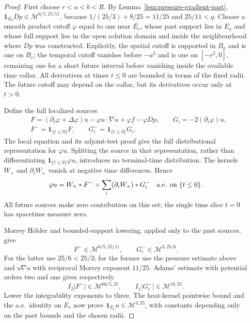 \documentclass[11pt,reqno]{amsart}
\begin{document}
\begin{proof}
First choose $r<a<b<R$. By Lemma~\ref{lem:pressure-gradient-past},
$\mathbf1_{E_b}Dp\in\mathcal M^{6/5,25/11}$, because
$1/(25/3)+8/25=11/25$ and $25/11<q$.
Choose a smooth product cutoff $\varphi$ equal to one near
$\overline{E_r}$, whose past support lies in $E_a$ and whose full
support lies in the open solution domain and inside the neighbourhood
where $Dp$ was constructed. Explicitly, the spatial cutoff is supported
in $B_a$ and is one on $B_r$; the temporal cutoff vanishes before
$-a^2$ and is one on $[-r^2,0]$, remaining one for a short future interval
before vanishing inside the available time collar. All derivatives at
times $t\le0$ are bounded in terms of the fixed radii. The future cutoff
may depend on the collar, but its derivatives occur only at $t>0$.

Define the full localized sources
\[\begin{aligned}
 &F=(\partial_t\varphi+\Delta\varphi)u
       -\varphi u\cdot\nabla u+\varphi f-\varphi Dp,
 \qquad G_i=-2(\partial_i\varphi)u,\\
 &F^-=\mathbf1_{\{t\le0\}}F,\qquad
 G_i^-=\mathbf1_{\{t\le0\}}G_i.
\end{aligned}\]
The local equation and its adjoint-test proof give the full distributional
representation for $\varphi u$. Splitting the source in that
representation, rather than differentiating $\mathbf1_{\{t\le0\}}\varphi u$,
introduces no terminal-time distribution. The kernels $W_+$ and
$\partial_iW_+$ vanish at negative time differences. Hence
\[
 \varphi u=W_+*F^-+\sum_i(\partial_iW_+)*G_i^-
 \quad\hbox{a.e. on }\{t\le0\}.
\]
All future sources make zero contribution on this set; the single time
slice $t=0$ has spacetime measure zero.

Morrey H\"older and bounded-support lowering, applied only to the past
sources, give
\[
 F^-\in\mathcal M^{6/5,25/11},\qquad
 G_i^-\in\mathcal M^{3,25/6}.
\]
For the latter use $25/6<25/3$; for the former use the pressure estimate
above and $u\nabla u$ with reciprocal Morrey exponent $11/25$.
Adams' estimate with potential orders two and one gives respectively
\[
 I_2|F^-|\in\mathcal M^{66/5,25},\qquad
 I_1|G_i^-|\in\mathcal M^{18,25}.
\]
Lower the integrability exponents to three. The heat-kernel pointwise
bound and the a.e.\ identity on $E_r$ now prove
$\mathbf1_{E_r}u\in\mathcal M^{3,25}$, with constants depending only
on the past bounds and the chosen radii.


\end{proof}
\end{document}
